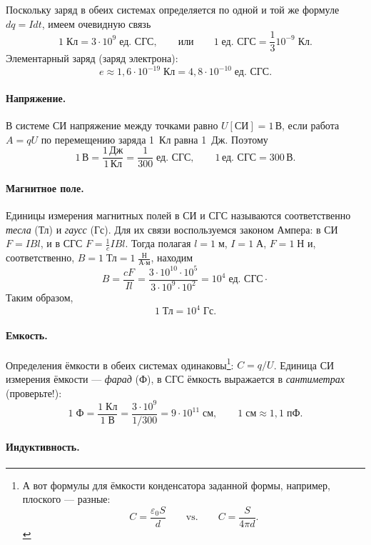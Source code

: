 Поскольку заряд в обеих системах определяется по одной и той же формуле
$dq=Idt$, имеем очевидную связь
\[
1\;\text{Кл}=3\cdot10^{9}\;\text{ед. СГС},\qquad\text{или}\qquad1\;\text{ед. СГС}=\frac{1}{3}10^{-9}\;\text{Кл}.
\]
Элементарный заряд (заряд электрона):
\[
e\approx1{,}6\cdot10^{-19}\;\text{Кл}=4{,}8\cdot10^{-10}\;\text{ед. СГС}.
\]


\paragraph{Напряжение.}

В системе СИ напряжение между точками равно $U[\text{СИ}]=1\,\text{В}$,
если работа $A=qU$ по перемещению заряда 1~Кл равна 1~Дж. Поэтому
\[
1\,\text{В}=\frac{1\,\text{Дж}}{1\,\text{Кл}}=\frac{1}{300}\;\text{ед. СГС},\qquad1\,\text{ед. СГС}=300\,\text{В}.
\]


\paragraph{Магнитное поле.}

Единицы измерения магнитных полей в СИ и СГС называются соответственно
\emph{тесла} (Тл) и \emph{гаусс} (Гс). Для их связи воспользуемся
законом Ампера: в СИ $F=IBl$, и в СГС $F=\frac{1}{c}IBl$. Тогда
полагая $l=1\;\text{м}$, $I=1\;\text{А}$, $F=1\;\text{Н}$ и, соответственно,
$B=1\;\text{Тл}=1\;\frac{\text{Н}}{\text{А}\cdot\text{м}}$, находим
\[
B=\frac{cF}{Il}=\frac{3\cdot10^{10}\cdot10^{5}}{3\cdot10^{9}\cdot10^{2}}=10^{4}\;\text{ед. СГС}\cdot
\]
Таким образом, 
\[
1\;\text{Тл}=10^{4}\;\text{Гс}.
\]


\paragraph{Емкость.}

Определения ёмкости в обеих системах одинаковы\footnote{А вот формулы для ёмкости конденсатора заданной формы, например, плоского
--- разные:
\[
C=\frac{\varepsilon_{0}S}{d}\qquad\mathrm{vs.}\qquad C=\frac{S}{4\pi d}.
\]
}: $C=q/U$. Единица СИ измерения ёмкости --- \emph{фарад} (Ф), в
СГС ёмкость выражается в \emph{сантиметрах} (проверьте!):
\[
1\;\text{Ф}=\frac{1\;\text{Кл}}{1\;\text{В}}=\frac{3\cdot10^{9}}{1/300}=9\cdot10^{11}\;\text{см},\qquad1\;\text{см}\approx1{,}1\;\text{пФ}.
\]


\paragraph{Индуктивность.}

